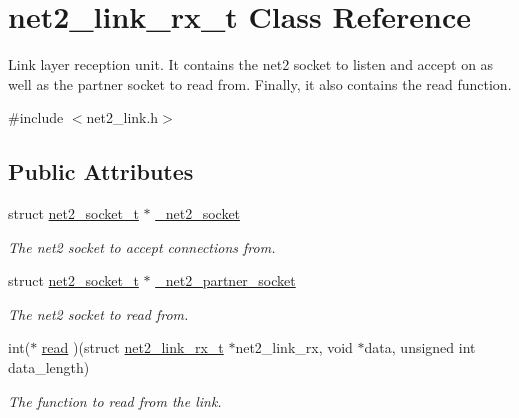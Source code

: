 \hypertarget{structnet2__link__rx__t}{\section{net2\-\_\-link\-\_\-rx\-\_\-t Class Reference}
\label{structnet2__link__rx__t}
}


Link layer reception unit. It contains the net2 socket to listen and accept on as well as the partner socket to read from. Finally, it also contains the read function.  




{\ttfamily \#include $<$net2\-\_\-link.\-h$>$}

\subsection*{Public Attributes}
\begin{DoxyCompactItemize}
\item 
\hypertarget{structnet2__link__rx__t_a83d0d9ea37e3eadaf8e33583c58b2b09}{struct \hyperlink{structnet2__socket__t}{net2\-\_\-socket\-\_\-t} $\ast$ \hyperlink{structnet2__link__rx__t_a83d0d9ea37e3eadaf8e33583c58b2b09}{\-\_\-net2\-\_\-socket}}\label{structnet2__link__rx__t_a83d0d9ea37e3eadaf8e33583c58b2b09}

\begin{DoxyCompactList}\small\item\em The net2 socket to accept connections from. \end{DoxyCompactList}\item 
\hypertarget{structnet2__link__rx__t_aa8720342c7b6c92c5d3b1b23ffa8af8f}{struct \hyperlink{structnet2__socket__t}{net2\-\_\-socket\-\_\-t} $\ast$ \hyperlink{structnet2__link__rx__t_aa8720342c7b6c92c5d3b1b23ffa8af8f}{\-\_\-net2\-\_\-partner\-\_\-socket}}\label{structnet2__link__rx__t_aa8720342c7b6c92c5d3b1b23ffa8af8f}

\begin{DoxyCompactList}\small\item\em The net2 socket to read from. \end{DoxyCompactList}\item 
\hypertarget{structnet2__link__rx__t_a481aaf6a6a6923c582c1e4f5e67d4333}{int($\ast$ \hyperlink{structnet2__link__rx__t_a481aaf6a6a6923c582c1e4f5e67d4333}{read} )(struct \hyperlink{structnet2__link__rx__t}{net2\-\_\-link\-\_\-rx\-\_\-t} $\ast$net2\-\_\-link\-\_\-rx, void $\ast$data, unsigned int data\-\_\-length)}\label{structnet2__link__rx__t_a481aaf6a6a6923c582c1e4f5e67d4333}

\begin{DoxyCompactList}\small\item\em The function to read from the link. \end{DoxyCompactList}\end{DoxyCompactItemize}


